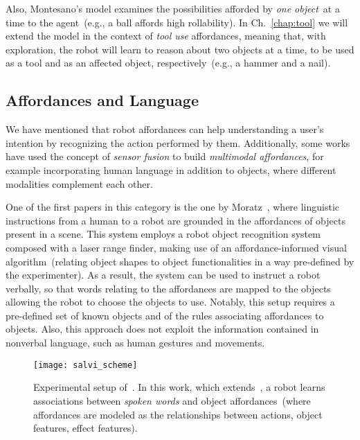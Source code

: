 Also, Montesano's model examines the possibilities afforded by \emph{one object}~at a time to the agent~(e.g., a ball affords high rollability).
In Ch.~\ref{chap:tool} we will extend the model in the context of \emph{tool use} affordances, meaning that, with exploration, the robot will learn to reason about two objects at a time, to be used as a tool and as an affected object, respectively~(e.g., a hammer and a nail).

\subsection{Affordances and Language}
\label{sec:background:previous_works:aff_language}

We have mentioned that robot affordances can help understanding a user's intention by recognizing the action performed by them.
Additionally, some works have used the concept of \emph{sensor fusion} to build \emph{multimodal affordances}, for example incorporating human language in addition to objects, where different modalities complement each other.

One of the first papers in this category is the one by Moratz~\cite{moratz:2008}, where linguistic instructions from a human to a robot are grounded in the affordances of objects present in a scene.
This system employs a robot object recognition system composed with a laser range finder, making use of an affordance-informed visual algorithm~(relating object shapes to object functionalities in a way pre-defined by the experimenter).
As a result, the system can be used to instruct a robot verbally, so that words relating to the affordances are mapped to the objects allowing the robot to choose the objects to use.
Notably, this setup requires a pre-defined set of known objects and of the rules associating affordances to objects.
Also, this approach does not exploit the information contained in nonverbal language, such as human gestures and movements.

\begin{figure}
    \texttt{[image: salvi\_scheme]}
    \caption[Experimental setup of~\cite{salvi:2012:smcb}.]{Experimental setup of~\cite{salvi:2012:smcb}. In this work, which extends~\cite{montesano:2008}, a robot learns associations between \emph{spoken words} and object affordances~(where affordances are modeled as the relationships between actions, object features, effect features).}
    \label{fig:salvi_setup}
\end{figure}

